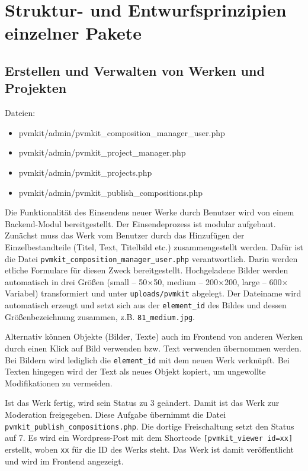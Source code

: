 \documentclass[a4paper,11pt]{article}
\begin{document}
\section{Struktur- und Entwurfsprinzipien einzelner Pakete}
 
\subsection{Erstellen und Verwalten von Werken und Projekten}
 
Dateien: 
\begin{itemize}\itemsep0pt\tt
\item pvmkit/admin/pvmkit\_composition\_manager\_user.php 
\item pvmkit/admin/pvmkit\_project\_manager.php
\item pvmkit/admin/pvmkit\_projects.php
\item pvmkit/admin/pvmkit\_publish\_compositions.php
\end{itemize}

Die Funktionalität des Einsendens neuer Werke durch Benutzer wird von einem
Backend-Modul bereitgestellt. Der Einsendeprozess ist modular aufgebaut.
Zunächst muss das Werk vom Benutzer durch das Hinzufügen der
Einzelbestandteile (Titel, Text, Titelbild etc.)  zusammengestellt werden.
Dafür ist die Datei \texttt{pvmkit\_composition\_manager\_user.php}
verantwortlich. Darin werden etliche Formulare für diesen Zweck
bereitgestellt.  Hochgeladene Bilder werden automatisch in drei Größen (small
-- 50$\times$50, medium -- 200$\times$200, large -- 600$\times$Variabel)
transformiert und unter \texttt{uploads/pvmkit} abgelegt. Der Dateiname wird
automatisch erzeugt und setzt sich aus der \texttt{element\_id} des Bildes und
dessen Größenbezeichnung zusammen, z.B.  \texttt{81\_medium.jpg}.
 
Alternativ können Objekte (Bilder, Texte) auch im Frontend von anderen Werken
durch einen Klick auf Bild verwenden bzw.  Text verwenden übernommen werden.
Bei Bildern wird lediglich die \texttt{element\_id} mit dem neuen Werk
verknüpft. Bei Texten hingegen wird der Text als neues Objekt kopiert, um
ungewollte Modifikationen zu vermeiden.
 
Ist das Werk fertig, wird sein Status zu 3 geändert. Damit ist das Werk zur
Moderation freigegeben. Diese Aufgabe übernimmt die Datei
\texttt{pvmkit\_publish\_compositions.php}.  Die dortige Freischaltung setzt
den Status auf 7. Es wird ein Wordpress-Post mit dem Shortcode
\texttt{[pvmkit\_viewer id=xx]} erstellt, woben \texttt{xx} für die ID des
Werks steht. Das Werk ist damit veröffentlicht und wird im Frontend angezeigt.
 
\end{document}
